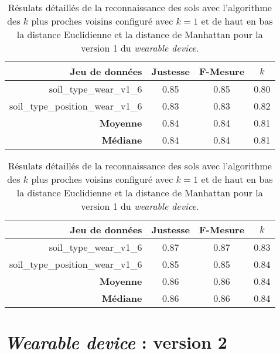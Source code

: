 \begin{table}[H]\renewcommand{\arraystretch}{0.5}
	\centering
	\caption{Résulats détaillés de la reconnaissance des sols avec l'algorithme des $k$ plus proches voisins configuré avec $k=1$ et de haut en bas la distance Euclidienne et la distance de Manhattan pour la version 1 du \textit{wearable device}.}
	\label{tab:knn-wear-v1}
	\begin{tabular}{@{}rccc@{}}
		\toprule
			\textbf{Jeu de données} & \textbf{Justesse} & \textbf{F-Mesure} & \textbf{$k$} \\
		\midrule
			soil\_type\_wear\_v1\_6 & 0.85 & 0.85 & 0.80 \\
			soil\_type\_position\_wear\_v1\_6 & 0.83 & 0.83 & 0.82 \\
			\textbf{Moyenne} & 0.84 & 0.84 & 0.81 \\
			\textbf{Médiane} & 0.84 & 0.84 & 0.81 \\
	\end{tabular}
	\begin{tabular}{@{}rccc@{}}
		\toprule
			\textbf{Jeu de données} & \textbf{Justesse} & \textbf{F-Mesure} & \textbf{$k$} \\
		\midrule
			soil\_type\_wear\_v1\_6 & 0.87 & 0.87 & 0.83 \\
			soil\_type\_position\_wear\_v1\_6 & 0.85 & 0.85 & 0.84 \\
			\textbf{Moyenne} & 0.86 & 0.86 & 0.84 \\
			\textbf{Médiane} & 0.86 & 0.86 & 0.84 \\
		\bottomrule
	\end{tabular}
\end{table}

\section{\textit{Wearable device} : version 2}

